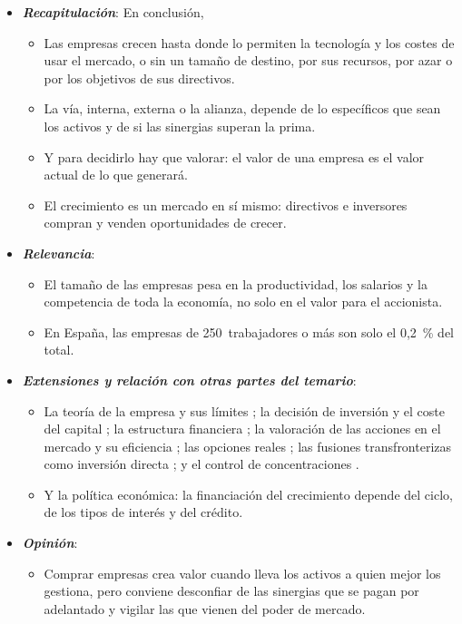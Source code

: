 \documentclass[11pt]{article}
\begin{document}
\begin{itemize}
\item \textbf{\emph{Recapitulación}}: En conclusión,
  \begin{itemize}
  \item Las empresas crecen hasta donde lo permiten la tecnología y los costes de usar el mercado, o sin un tamaño de destino, por sus recursos, por azar o por los objetivos de sus directivos.

  \item La vía, interna, externa o la alianza, depende de lo específicos que sean los activos y de si las sinergias superan la prima.

  \item Y para decidirlo hay que valorar: el valor de una empresa es el valor actual de lo que generará.

  \item El crecimiento es un mercado en sí mismo: directivos e inversores compran y venden oportunidades de crecer.
  \end{itemize}
\item \textbf{\emph{Relevancia}}:
  \begin{itemize}
  \item El tamaño de las empresas pesa en la productividad, los salarios y la competencia de toda la economía, no solo en el valor para el accionista.

  \item En España, las empresas de 250~trabajadores o más son solo el 0,2~\% del total\nocite{MIT2026CifrasPyme}.
  \end{itemize}
\item \textbf{\emph{Extensiones y relación con otras partes del temario}}:
  \begin{itemize}
  \item La teoría de la empresa y sus límites ; la decisión de inversión y el coste del capital ; la estructura financiera ; la valoración de las acciones en el mercado y su eficiencia ; las opciones reales ; las fusiones transfronterizas como inversión directa ; y el control de concentraciones  .

  \item Y la política económica: la financiación del crecimiento depende del ciclo, de los tipos de interés y del crédito.
  \end{itemize}
\item \textbf{\emph{Opinión}}:
  \begin{itemize}
  \item Comprar empresas crea valor cuando lleva los activos a quien mejor los gestiona, pero conviene desconfiar de las sinergias que se pagan por adelantado y vigilar las que vienen del poder de mercado.


\end{itemize}
\end{itemize}
\end{document}
